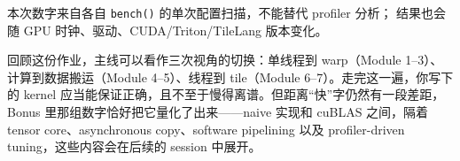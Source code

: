 \documentclass[11pt,a4paper,fontset=fandol]{ctexart}
\begin{document}
本次数字来自各自 \texttt{bench()} 的单次配置扫描，不能替代 profiler 分析；
结果也会随 GPU 时钟、驱动、CUDA/Triton/TileLang 版本变化。
\begin{lookback}
回顾这份作业，主线可以看作三次视角的切换：单线程到 warp（Module 1--3）、计算到数据搬运（Module 4--5）、线程到 tile（Module 6--7）。走完这一遍，你写下的 kernel 应当能保证正确，且不至于慢得离谱。但距离“快”字仍然有一段差距，Bonus 里那组数字恰好把它量化了出来——naive 实现和 cuBLAS 之间，隔着 tensor core、asynchronous copy、software pipelining 以及 profiler-driven tuning，这些内容会在后续的 session 中展开。
\end{lookback}
\end{document}
